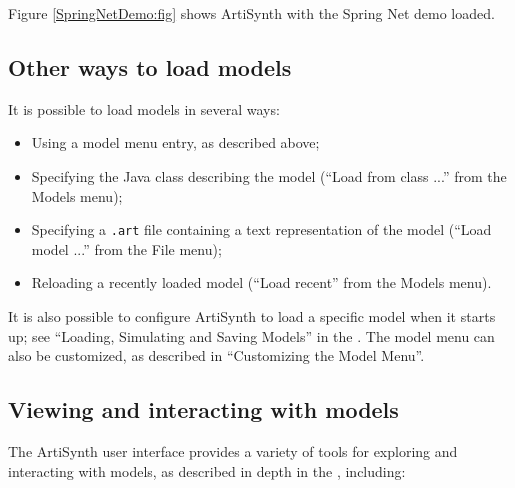 Figure \ref{SpringNetDemo:fig} shows ArtiSynth with the {\sf Spring
Net} demo loaded.

\subsection{Other ways to load models}

It is possible to load models in several ways:

\begin{itemize}

\item Using a model menu entry, as described above;

\item Specifying the Java class describing the model
({\sf ``Load from class ...''} from the {\sf Models} menu);

\item Specifying a {\tt .art} file containing a text
representation of the model ({\sf ``Load model ...''} from the {\sf
File} menu);

\item Reloading a recently loaded model 
({\sf ``Load recent''} from the {\sf Models} menu).

\end{itemize}

It is also possible to configure ArtiSynth to load a specific model
when it starts up; see ``Loading, Simulating and Saving Models'' in the
.
The model menu can also be customized, as described in ``Customizing
the Model Menu''.

\subsection{Viewing and interacting with models}

The ArtiSynth user interface provides a variety of tools for exploring
and interacting with models, as described in depth in
the ,
including:

